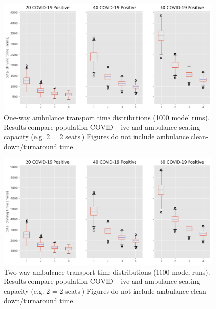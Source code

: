 \begin{figure}
  \includegraphics[width=\linewidth]{image/prelim_model_inward_only_ils.png}
  \caption{One-way ambulance transport time distributions (1000 model runs). Results compare population COVID +ive and ambulance seating capacity (e.g. 2 = 2 seats.) Figures do not include ambulance clean-down/turnaround time.}
  \label{fig:transport_inward}
\end{figure}

\begin{figure}
  \includegraphics[width=\linewidth]{image/prelim_model_inward_outward_ILS.png}
  \caption{Two-way ambulance transport time distributions (1000 model runs). Results compare population COVID +ive and ambulance seating capacity (e.g. 2 = 2 seats.) Figures do not include ambulance clean-down/turnaround time.}
  \label{fig:transport_inward_outward}
\end{figure}

